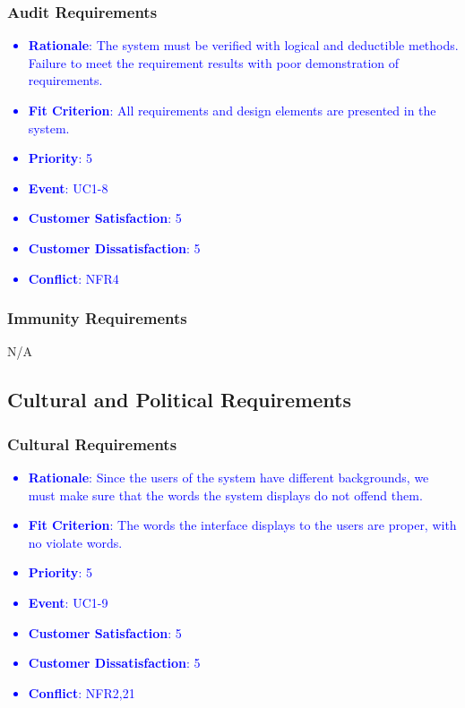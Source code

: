 \documentclass[12pt, titlepage]{article}
\newcounter{reqnum} %
\newcounter{freqnum} %
\begin{document}
\begin{itemize}
\subsubsection{Audit Requirements}
\textcolor{blue}{
\item[NFR\refstepcounter{freqnum}\thefreqnum
\label{NFR}:] 
\begin{itemize}
    \item \textbf{Rationale}: The system must be verified with logical and deductible methods. Failure to meet the requirement results with poor demonstration of requirements.
    \item \textbf{Fit Criterion}: All requirements and design elements are presented in the system. 
    \item \textbf{Priority}: 5
    \item \textbf{Event}: UC1-8%
    \item \textbf{Customer Satisfaction}: 5
    \item \textbf{Customer Dissatisfaction}: 5
    \item \textbf{Conflict}: \textcolor{blue}{NFR4}
\end{itemize}
}
\subsubsection{Immunity Requirements}
N/A
\subsection{Cultural and Political Requirements}

\subsubsection{Cultural Requirements}
\textcolor{blue}{
\item[NFR\refstepcounter{freqnum}\thefreqnum
\label{NFR}:] 
\begin{itemize}
    \item \textbf{Rationale}: Since the users of the system have different backgrounds, we must make sure that the words the system displays do not offend them.
    \item \textbf{Fit Criterion}: The words the interface displays to the users are proper, with no violate words.
    \item \textbf{Priority}: 5
    \item \textbf{Event}: UC1-9%
    \item \textbf{Customer Satisfaction}: 5
    \item \textbf{Customer Dissatisfaction}: 5
    \item \textbf{Conflict}: \textcolor{blue}{NFR2,21}
\end{itemize}
}


\end{itemize}
\end{document}

